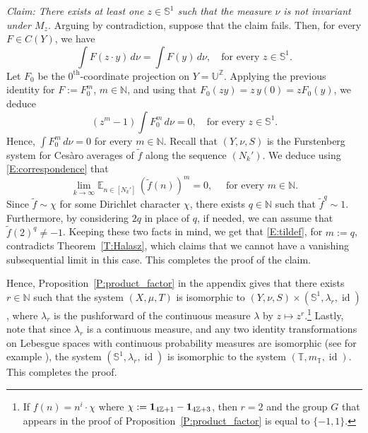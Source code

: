 \documentclass[11pt]{amsart}
\theoremstyle{definition}
\newcommand{\E}{{\mathbb E}}
\newcommand{\N}{{\mathbb N}}
\renewcommand{\S}{\mathbb{S}}
\newcommand{\T}{{\mathbb T}}
\newcommand{\Z}{{\mathbb Z}}
\newcommand{\U}{{\mathbb U}}
\DeclareMathOperator{\id}{id}
\begin{document}
   \smallskip

   {\em Claim: There exists at least one $z\in\S^1$ such that the measure $\nu$ is not invariant under $M_z$.}
  Arguing by contradiction, suppose that the claim fails. Then, for every $F\in C(Y)$, we have
   $$
   \int F(z\cdot y)\, d\nu=\int F(y)\, d\nu, \quad \text{for every } z\in \S^1.
   $$
Let    $F_0$ be the $0^{\text{th}}$-coordinate projection  on $Y=\U^\Z$.
   Applying the previous identity for $F:=F_0^m$,  $m\in \N$, and using that $F_0(zy)=z\, y(0)=zF_0(y)$,  we deduce
   $$
   (z^m-1)\int F_0^m\, d\nu=0, \quad \text{for every } z\in \S^1.
   $$
   Hence,    $\int F_0^m\, d\nu=0$ for every $m\in \N$. Recall that $(Y,\nu,S)$ is the Furstenberg system for Ces\`aro averages of $\tilde{f}$ along the sequence $(N_k')$.   We deduce using \eqref{E:correspondence} that
   \begin{equation}\label{E:tildef}
   \lim_{k\to\infty}\E_{n\in[N_k']} \, (\tilde{f}(n))^m=0, \quad \text{ for every } m\in \N.
   \end{equation}
Since $\tilde{f}\sim \chi$ for some Dirichlet character $\chi$, there  exists $q\in \N$   such that  $\tilde{f}^q\sim 1$. Furthermore, by considering $2q$ in place of $q$, if needed, we can assume that   $\tilde{f}(2)^q \neq  -1$. Keeping these two facts in mind, we get that \eqref{E:tildef}, for $m:=q$, contradicts  Theorem~\ref{T:Halasz}, which claims that we cannot have a vanishing subsequential limit in this case. This completes the proof of the claim.


 Hence, Proposition~\ref{P:product_factor} in the appendix gives that there exists $r\in \N$ such that the system $(X,\mu,T)$ is isomorphic to
 $(Y,\nu,S)\times(\S^1,\lambda_r,\id)$, where $\lambda_r$ is the pushforward of the continuous measure   $\lambda$ by $z\mapsto z^r$.\footnote{If $f(n)=n^{i}\cdot \chi$ where $\chi:={\bf 1}_{4\Z+1}-{\bf 1}_{4\Z+3}$, then $r=2$ and the group $G$ that appears in the proof of Proposition~\ref{P:product_factor} is equal to $\{-1, 1\}$.}  Lastly, note that  since   $\lambda_r$ is   a continuous measure, and any two identity transformations on Lebesgue spaces with continuous probability measures are isomorphic (see for example \cite[Theorem~17.41]{Ke12}),
 the system $(\S^1,\lambda_r,\id)$   is isomorphic to the system $(\T,m_\T,\id)$.
 This completes the proof.
\end{document}
